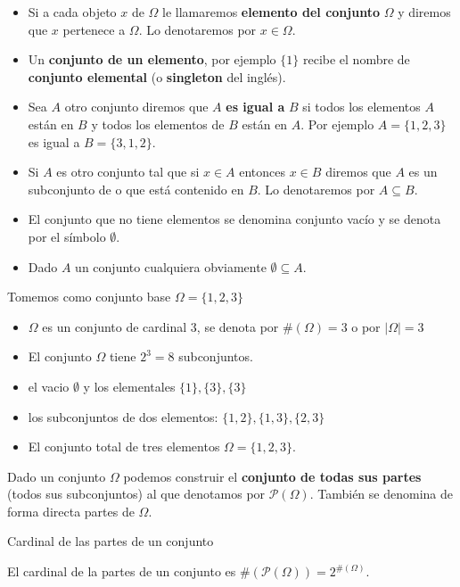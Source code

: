 \documentclass[]{book}
\providecommand{\tightlist}{%
  \setlength{\itemsep}{0pt}\setlength{\parskip}{0pt}}
\begin{document}
\begin{itemize}
\tightlist
\item
  Si a cada objeto \(x\) de \(\Omega\) le llamaremos \textbf{elemento del conjunto} \(\Omega\) y diremos que \(x\) pertenece a \(\Omega\). Lo denotaremos por \(x\in \Omega\).
\item
  Un \textbf{conjunto de un elemento}, por ejemplo \(\{1\}\) recibe el nombre de \textbf{conjunto elemental} (o \textbf{singleton} del inglés).
\item
  Sea \(A\) otro conjunto diremos que \(A\) \textbf{es igual a} \(B\) si todos los elementos \(A\) están en \(B\) y todos los elementos de \(B\) están en \(A\). Por ejemplo \(A=\{1,2,3\}\) es igual a \(B=\{3,1,2\}\).
\item
  Si \(A\) es otro conjunto tal que si \(x\in A\) entonces \(x\in B\) diremos que \(A\) es un subconjunto de o que está contenido en \(B\). Lo denotaremos por \(A\subseteq B.\)
\item
  El conjunto que no tiene elementos se denomina conjunto vacío y se denota por el símbolo \(\emptyset\).
\item
  Dado \(A\) un conjunto cualquiera obviamente \(\emptyset\subseteq A.\)
\end{itemize}

Tomemos como conjunto base \(\Omega=\{1,2,3\}\)

\begin{itemize}
\tightlist
\item
  \(\Omega\) es un conjunto de cardinal 3, se denota por \(\#(\Omega)=3\) o por \(|\Omega|=3\)
\item
  El conjunto \(\Omega\) tiene \(2^3=8\) subconjuntos.
\item
  el vacio \(\emptyset\) y los elementales \(\{1\},\{3\},\{3\}\)
\item
  los subconjuntos de dos elementos: \(\{1,2\},\{1,3\},\{2,3\}\)
\item
  El conjunto total de tres elementos \(\Omega=\{1,2,3\}.\)
\end{itemize}

Dado un conjunto \(\Omega\) podemos construir el \textbf{conjunto de todas sus partes} (todos sus subconjuntos) al que denotamos por \(\mathcal{P}(\Omega)\). También se denomina de forma directa partes de \(\Omega\).

 Cardinal de las partes de un conjunto

El cardinal de la partes de un conjunto es \(\#(\mathcal{P}(\Omega))=2^{\#(\Omega)}.\)
\end{document}
